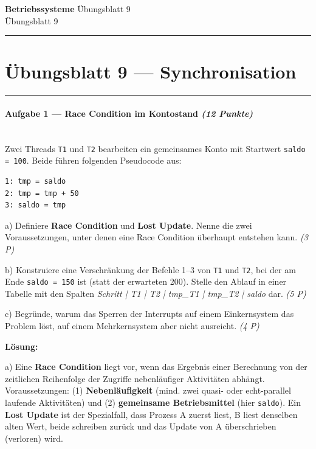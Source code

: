 \documentclass[11pt, a4paper]{article}
\providecommand{\nichttitle}{Übungsblatt}
\providecommand{\nichtsubtitle}{}
\renewcommand{\nichttitle}{Betriebssysteme}
\renewcommand{\nichtsubtitle}{Übungsblatt 9}
\begin{document}
\begin{center}
{\Large\bfseries\color{accent}\nichttitle}
\ifx\nichtsubtitle\empty\else
  \\[2pt]{\normalsize\color{accent!80!black}\nichtsubtitle}
\fi
\\[2pt]
\color{accent}\rule{0.4\linewidth}{0.8pt}\color{black}
\end{center}
\vspace{4pt}


\section{Übungsblatt 9 — Synchronisation}


\noindent\textcolor{rulegray}{\rule{\linewidth}{0.4pt}}


\paragraph{Aufgabe 1 — Race Condition im Kontostand \textit{(12 Punkte)}}\mbox{}\\[2pt]

Zwei Threads \texttt{T1} und \texttt{T2} bearbeiten ein gemeinsames Konto mit Startwert \texttt{saldo = 100}. Beide führen folgenden Pseudocode aus:


\begin{lstlisting}
1: tmp = saldo
2: tmp = tmp + 50
3: saldo = tmp
\end{lstlisting}


a) Definiere \textbf{Race Condition} und \textbf{Lost Update}. Nenne die zwei Voraussetzungen, unter denen eine Race Condition überhaupt entstehen kann. \textit{(3 P)}


b) Konstruiere eine Verschränkung der Befehle 1–3 von \texttt{T1} und \texttt{T2}, bei der am Ende \texttt{saldo = 150} ist (statt der erwarteten 200). Stelle den Ablauf in einer Tabelle mit den Spalten \textit{Schritt | T1 | T2 | tmp\_T1 | tmp\_T2 | saldo} dar. \textit{(5 P)}


c) Begründe, warum das Sperren der Interrupts auf einem Einkernsystem das Problem löst, auf einem Mehrkernsystem aber nicht ausreicht. \textit{(4 P)}


\textbf{Lösung:}


a) Eine \textbf{Race Condition} liegt vor, wenn das Ergebnis einer Berechnung von der zeitlichen Reihenfolge der Zugriffe nebenläufiger Aktivitäten abhängt. Voraussetzungen: (1) \textbf{Nebenläufigkeit} (mind. zwei quasi- oder echt-parallel laufende Aktivitäten) und (2) \textbf{gemeinsame Betriebsmittel} (hier \texttt{saldo}). Ein \textbf{Lost Update} ist der Spezialfall, dass Prozess A zuerst liest, B liest denselben alten Wert, beide schreiben zurück und das Update von A überschrieben (verloren) wird.
\end{document}
